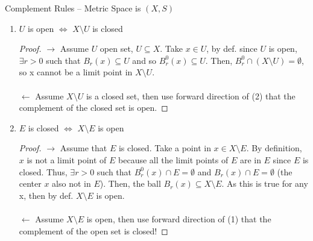 \documentclass[a4paper]{article}
\begin{document}
\begin{prop}
Complement Rules -- Metric Space is $(X, S)$ 
  \begin{enumerate}
    \item $U$ is open $\iff$ $X \setminus U$ is closed
      \begin{proof}
        $\to$ Assume $U$ open set, $U \subseteq X$.  Take $x \in U$, by def. since $U$ is open, $\exists r > 0$ such 
        that $B_r(x) \subseteq U$ and so $B_r^0 (x) \subseteq U$. Then, 
        $B_r^0 \cap (X \setminus U) = \emptyset$, so x cannot be a limit point in $X \setminus U$.  \\ \\
        $\leftarrow$ Assume $X \setminus U$ is a closed set, then use forward direction of (2) that the complement of the closed set is open.
      \end{proof}
    \item $E$ is closed $\iff$ $X\setminus E$ is open
      \begin{proof}
        $\to$ Assume that $E$ is closed. Take a point in $x \in X \setminus E$. By definition, $x$ is not a limit point 
        of $E$ because all the limit points of $E$ are in $E$ since $E$ is closed. Thus, $\exists r > 0$ such that
        $B_{r}^0 (x) \cap E = \emptyset$ and $B_{r} (x) \cap E = \emptyset$ (the center $x$ also not in $E$). Then, 
        the ball $B_r(x) \subseteq X \setminus E$. As this is true for any x, then by def. $X \setminus E$ is open. \\ \\
        $\leftarrow$ Assume $X \setminus E$ is open, then use forward direction of (1) that the complement of the open set is closed!  
      \end{proof}
  \end{enumerate}
\end{prop}
\end{document}

